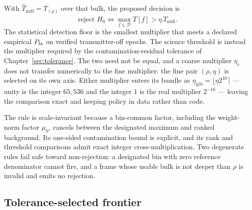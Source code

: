 With $\hat{T}_{\mathrm{null}}=T_{(\rho)}$ over that bulk, the proposed decision is
\begin{equation}
\text{reject } H_0 \iff \max_{f \in \mathcal{D}} T[f] > \eta\,\hat{T}_{\mathrm{null}}.
\end{equation}
The statistical detection floor is the smallest multiplier that meets a declared empirical $P_{\rm fa}$ on verified transmitter-off epochs. The science threshold is instead the multiplier required by the contamination-residual tolerance of Chapter~\ref{sec:tolerance}. The two need not be equal, and a coarse multiplier $\eta_c$ does not transfer numerically to the fine multiplier: the fine pair $(\rho,\eta)$ is selected on its own axis. Either multiplier enters its bundle as $\eta_{q16}=\lfloor\eta 2^{16}\rceil$ --- unity is the integer $65{,}536$ and the integer $1$ is the real multiplier $2^{-16}$ --- leaving the comparison exact and keeping policy in data rather than code.

The rule is scale-invariant because a bin-common factor, including the weight-norm factor $\mu_0$, cancels between the designated maximum and ranked background. Its one-sided contamination bound is explicit, and its rank and threshold comparisons admit exact integer cross-multiplication. Two degenerate rules fail safe toward non-rejection: a designated bin with zero reference denominator cannot fire, and a frame whose usable bulk is not deeper than $\rho$ is invalid and emits no rejection.

\subsection*{Tolerance-selected frontier}

